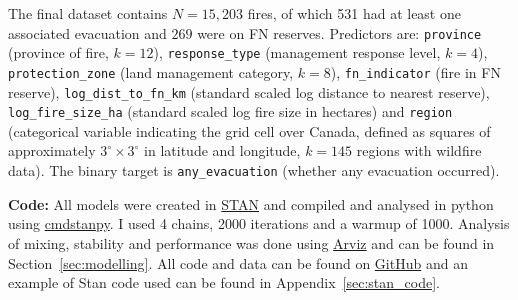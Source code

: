 The final dataset contains $N=15,203$ fires, of which 531 had at least one associated evacuation and $269$ were on FN reserves. Predictors are: \texttt{province} (province of fire, $k=12$), \texttt{response\_type} (management response level, $k=4$), \texttt{protection\_zone} (land management category, $k=8$), \texttt{fn\_indicator} (fire in FN reserve), \texttt{log\_dist\_to\_fn\_km} (standard scaled log distance to nearest reserve), \texttt{log\_fire\_size\_ha} (standard scaled log fire size in hectares) and \texttt{region} (categorical variable indicating the grid cell over Canada, defined as squares of approximately $3^\circ \times 3^\circ$ in latitude and longitude, $k=145$ regions with wildfire data). The binary target is \texttt{any\_evacuation} (whether any evacuation occurred).

\textbf{Code:} All models were created in \href{https://mc-stan.org/}{STAN} and compiled and analysed in python using \href{https://github.com/stan-dev/cmdstanpy}{cmdstanpy}. I used 4 chains, 2000 iterations and a warmup of 1000. Analysis of mixing, stability and performance was done using \href{https://github.com/arviz-devs/arviz}{Arviz} and can be found in Section~\ref{sec:modelling}. All code and data can be found on \href{https://github.com/PierreRL/Wildfire_Evacuations}{GitHub} and an example of Stan code used can be found in Appendix~\ref{sec:stan_code}.